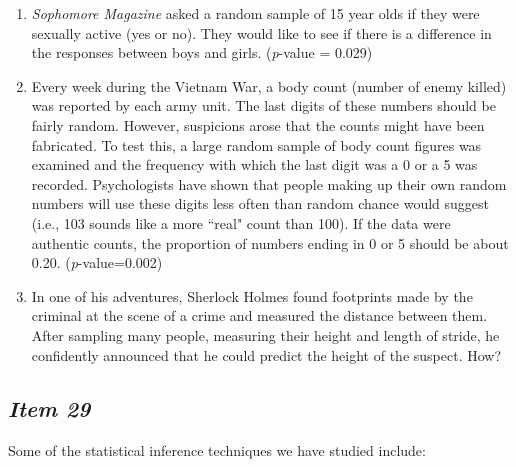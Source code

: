 \begin{enumerate}[leftmargin=1cm, itemsep=.2em]
\bigskip


\item \textit{Sophomore Magazine} asked a random sample of 15 year olds if they were sexually active (yes or no). They would like to see if there is a difference in the responses between boys and girls. (\textit{p}-value = 0.029)


\bigskip 


\item Every week during the Vietnam War, a body count (number of enemy killed) was reported by each army unit. The last digits of these numbers should be fairly random. However, suspicions arose that the counts might have been fabricated. To test this, a large random sample of body count figures was examined and the frequency with which the last digit was a 0 or a 5 was recorded. Psychologists have shown that people making up their own random numbers will use these digits less often than random chance would suggest (i.e., 103 sounds like a more ``real" count than 100). If the data were authentic counts, the proportion of numbers ending in 0 or 5 should be about 0.20. (\textit{p}-value=0.002)


\bigskip 


\item In one of his adventures, Sherlock Holmes found footprints made by the criminal at the scene of a crime and measured the distance between them. After sampling many people, measuring their height and length of stride, he confidently announced that he could predict the height of the suspect. How?


\end{enumerate}








\subsection{\textbf{\textit{Item 29}}}


Some of the statistical inference techniques we have studied include:


